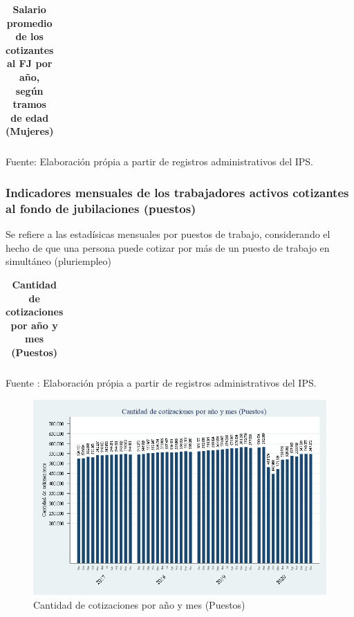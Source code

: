 \begin{table}[H]
\begin{center}
\scriptsize     
\caption{\bf{Salario promedio de los cotizantes al FJ por año, según tramos de edad (Mujeres) }}
\begin{tabular}{l|rrrrrrrrrrrrr}

\end{tabular}
                    \item Fuente: Elaboración própia a partir de registros administrativos del IPS.
\end{center}
\end{table}

\subsubsection{Indicadores mensuales de los trabajadores activos cotizantes al fondo de jubilaciones (puestos)}

Se refiere a las estadísicas mensuales por puestos de trabajo,
considerando el hecho de que una persona puede cotizar por más de un
puesto de trabajo en simultáneo (pluriempleo)

\begin{table}[H]
\begin{center}
\scriptsize     
\caption{\bf{Cantidad de cotizaciones por año y mes (Puestos)}}
\begin{tabular}{l|rrrrrrrrrrrrr}

\end{tabular}
                    \item Fuente : Elaboración própia a partir de registros administrativos del IPS.
\end{center}
\end{table}

\begin{figure}[H]
\begin{center}
                    \caption{Cantidad de cotizaciones por año y mes (Puestos)}
                    \vspace{0.5cm}
                    \includegraphics[scale=0.6]{RA_IPS_cotizaciones_puestos_2010a2020_mes.png}
\end{center}
\end{figure}

